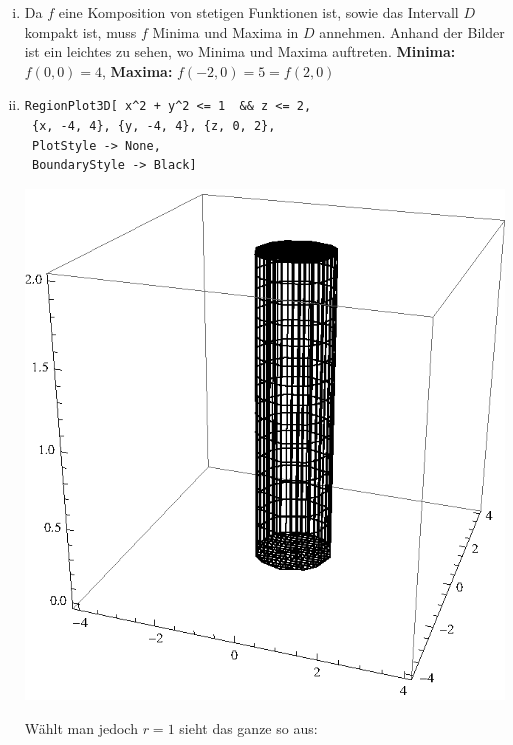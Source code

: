 \documentclass[10pt,a4paper]{scrartcl}
\begin{document}
\begin{enumerate}[(i)]
\begin{minipage}{0.50\columnwidth}
\begin{center}
\end{center}
\end{minipage}
\item 
Da $f$ eine Komposition von stetigen Funktionen ist, sowie das Intervall $D$ kompakt ist, muss $f$ Minima und Maxima in $D$ annehmen. Anhand der Bilder ist ein leichtes zu sehen, wo Minima und Maxima auftreten. \textbf{Minima: } $f(0,0) = 4$, \textbf{Maxima: } %
$f(-2,0) = 5 = f(2,0)$
\item 
\begin{minipage}{0.49\columnwidth}
\begin{lstlisting}[caption= Mathematica Code für den Graph von Z]
RegionPlot3D[ x^2 + y^2 <= 1  && z <= 2, 
 {x, -4, 4}, {y, -4, 4}, {z, 0, 2}, 
 PlotStyle -> None, 
 BoundaryStyle -> Black]
\end{lstlisting}
\end{minipage}
\begin{minipage}{0.50\columnwidth}
\begin{center}
\includegraphics[scale=0.7]{1iv3.eps} 
\end{center}
\end{minipage}
\begin{minipage}{0.49\columnwidth}
Wählt man jedoch $r=1$ sieht das ganze so aus:

\end{minipage}
\end{enumerate}
\end{document}
